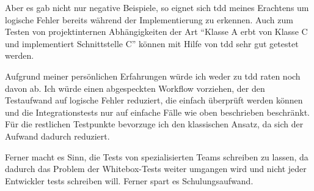 \documentclass{mitschrift}
\begin{document}
Aber es gab nicht nur negative Beispiele, so eignet sich \gls{tdd} meines
Erachtens um logische Fehler bereits während der Implementierung zu erkennen.
Auch zum Testen von projektinternen Abhängigkeiten der Art "`Klasse A erbt von
Klasse C und implementiert Schnittstelle C"' können mit Hilfe von \gls{tdd}
sehr gut getestet werden.

Aufgrund meiner persönlichen Erfahrungen würde ich weder zu \gls{tdd} raten
noch davon ab. Ich würde einen abgespeckten Workflow vorziehen, der den
Testaufwand auf logische Fehler reduziert, die einfach überprüft werden können
und die Integrationstests nur auf einfache Fälle wie oben beschrieben
beschränkt. Für die restlichen Testpunkte bevorzuge ich den klassischen Ansatz,
da sich der Aufwand dadurch reduziert.

Ferner macht es Sinn, die Tests von spezialisierten Teams schreiben zu lassen,
da dadurch das Problem der Whitebox-Tests weiter umgangen wird und nicht jeder
Entwickler tests schreiben will. Ferner spart es Schulungsaufwand.




\printglossary
\end{document}
